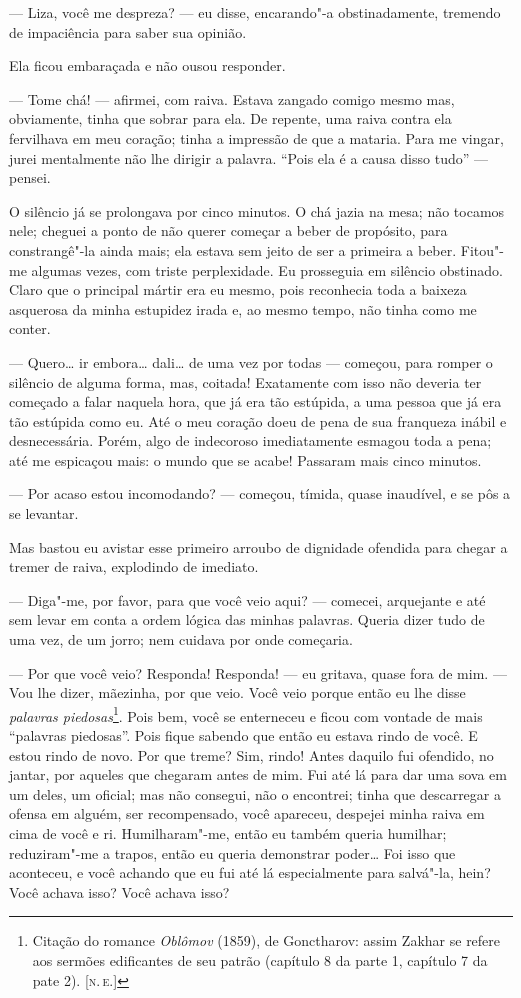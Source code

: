 --- Liza, você me despreza? --- eu disse, encarando"-a obstinadamente,
tremendo de impaciência para saber sua opinião.

Ela ficou embaraçada e não ousou responder.

--- Tome chá! --- afirmei, com raiva. Estava zangado comigo mesmo mas,
obviamente, tinha que sobrar para ela. De repente, uma raiva contra ela
fervilhava em meu coração; tinha a impressão de que a mataria. Para me
vingar, jurei mentalmente não lhe dirigir a palavra. ``Pois ela é a
causa disso tudo'' --- pensei.

O silêncio já se prolongava por cinco minutos. O chá jazia na mesa; não
tocamos nele; cheguei a ponto de não querer começar a beber de
propósito, para constrangê"-la ainda mais; ela estava sem jeito de ser a
primeira a beber. Fitou"-me algumas vezes, com triste perplexidade. Eu
prosseguia em silêncio obstinado. Claro que o principal mártir era eu
mesmo, pois reconhecia toda a baixeza asquerosa da minha estupidez irada
e, ao mesmo tempo, não tinha como me conter.

--- Quero\ldots{} ir embora\ldots{} dali\ldots{} de uma vez por todas --- começou, para
romper o silêncio de alguma forma, mas, coitada! Exatamente com isso não
deveria ter começado a falar naquela hora, que já era tão estúpida, a
uma pessoa que já era tão estúpida como eu. Até o meu coração doeu de
pena de sua franqueza inábil e desnecessária. Porém, algo de indecoroso
imediatamente esmagou toda a pena; até me espicaçou mais: o mundo que se
acabe! Passaram mais cinco minutos.

--- Por acaso estou incomodando? --- começou, tímida, quase inaudível, e se
pôs a se levantar.

Mas bastou eu avistar esse primeiro arroubo de dignidade ofendida para
chegar a tremer de raiva, explodindo de imediato.

--- Diga"-me, por favor, para que você veio aqui? --- comecei, arquejante e
até sem levar em conta a ordem lógica das minhas palavras. Queria dizer
tudo de uma vez, de um jorro; nem cuidava por onde começaria.

--- Por que você veio? Responda! Responda! --- eu gritava, quase fora de
mim. --- Vou lhe dizer, mãezinha, por que veio. Você veio porque então eu
lhe disse \emph{palavras piedosas}\footnote{Citação do romance
  \emph{Oblômov} (1859), de Gonctharov: assim Zakhar se refere aos
  sermões edificantes de seu patrão (capítulo 8 da parte 1, capítulo 7
  da pate 2). {[}\textsc{n.\,e.}{]}}. Pois bem, você se enterneceu e ficou
com vontade de mais ``palavras piedosas''. Pois fique sabendo que então
eu estava rindo de você. E estou rindo de novo. Por que treme? Sim,
rindo! Antes daquilo fui ofendido, no jantar, por aqueles que chegaram
antes de mim. Fui até lá para dar uma sova em um deles, um oficial; mas
não consegui, não o encontrei; tinha que descarregar a ofensa em alguém,
ser recompensado, você apareceu, despejei minha raiva em cima de você e
ri. Humilharam"-me, então eu também queria humilhar; reduziram"-me a
trapos, então eu queria demonstrar poder\ldots{} Foi isso que aconteceu, e
você achando que eu fui até lá especialmente para salvá"-la, hein? Você
achava isso? Você achava isso?

